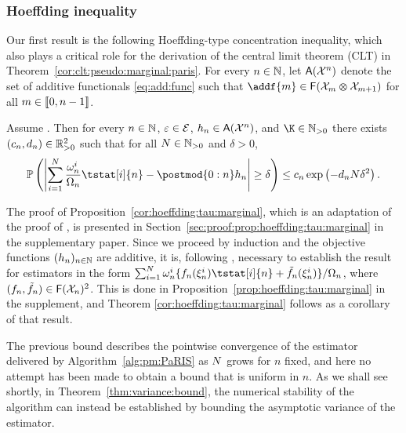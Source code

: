 
\subsubsection*{Hoeffding inequality}

Our first result is the following Hoeffding-type concentration inequality, which also plays a critical role for the derivation of the central limit theorem (CLT) in Theorem~\ref{cor:clt:pseudo:marginal:paris}. For every $n \in \mathbb{N}$, let $\mathsf{A}(\mathcal{X}^n)$ denote the set of additive functionals \eqref{eq:add:func} such that $\addf{m} \in \bmf{\Xfd_m \tensprod \Xfd_{m + 1}}$ for all $m \in \llbracket 0, n - 1 \rrbracket$.   
\begin{theorem}
\label{cor:hoeffding:tau:marginal}
Assume . Then for every $n \in \mathbb{N}$, $\varepsilon \in \mathcal{E}$, $h_n \in \mathsf{A}(\mathcal{X}^n)$, and $\K \in \nsetpos$ there exists $(c_n, d_n) \in \mathbb{R}_{> 0}^2$ such that for all $N \in \mathbb{N}_{> 0}$ and $\delta > 0$,
$$
\pP\left(\left| \sum_{i = 1}^\N \frac{\ewght{n}{i}}{\sumwght{n}} \tstat[i]{n} - \postmod{0:n} h_n \right| \geq \delta \right) \leq c_n \exp \left( - d_n \N \delta^2 \right).
$$
\end{theorem}

The proof of Proposition~\ref{cor:hoeffding:tau:marginal}, which is an adaptation of the proof of \cite[Theorem~1]{olsson:westerborn:2014b}, is presented in Section~\ref{sec:proof:prop:hoeffding:tau:marginal} in the supplementary paper. Since we proceed by induction and the objective functions $(h_n)_{n \in \mathbb{N}}$ are additive, it is, following \cite{olsson:westerborn:2014b}, necessary to establish the result for estimators in the form $\sum_{i = 1}^\N \ewght{n}{i} \{ f_n(\epart{n}{i}) \tstat[i]{n} + \ftd{n}(\epart{n}{i}) \} / \sumwght{n}$, where $(f_n, \tilde{f}_{n}) \in \mathsf{F}(\mathcal{X}_n)^2$. This is done in Proposition~\ref{prop:hoeffding:tau:marginal} in the supplement, and Theorem \ref{cor:hoeffding:tau:marginal} follows as a corollary of that result. 

The previous bound describes the pointwise convergence of the estimator delivered by Algorithm~\ref{alg:pm:PaRIS} as $N$ grows for $n$ fixed, and here no attempt has been made to obtain a bound that is uniform in $n$. As we shall see shortly, in Theorem~\ref{thm:variance:bound}, the numerical stability of the algorithm can instead be established by bounding the asymptotic variance of the estimator. %

